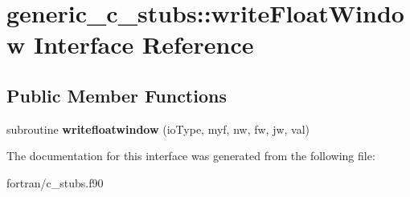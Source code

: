 \hypertarget{interfacegeneric__c__stubs_1_1write_float_window}{}\section{generic\+\_\+c\+\_\+stubs\+:\+:write\+Float\+Window Interface Reference}
\label{interfacegeneric__c__stubs_1_1write_float_window}
\subsection*{Public Member Functions}
\begin{DoxyCompactItemize}
\item 
\mbox{\label{interfacegeneric__c__stubs_1_1write_float_window_a664aae9e1be12c8d001377241e11ac66}} 
subroutine {\bfseries writefloatwindow} (io\+Type, myf, nw, fw, jw, val)
\end{DoxyCompactItemize}


The documentation for this interface was generated from the following file\+:\begin{DoxyCompactItemize}
\item 
fortran/c\+\_\+stubs.\+f90\end{DoxyCompactItemize}
